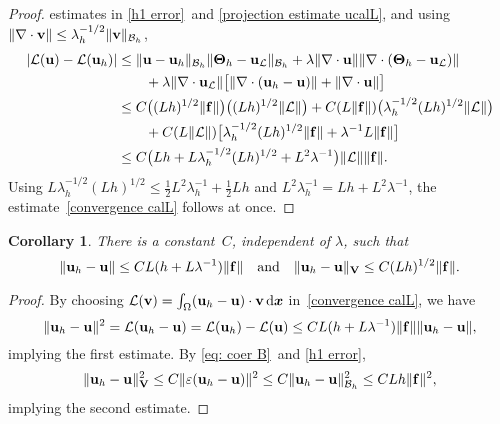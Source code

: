 \documentclass[11pt]{article}
\newcommand{\calB}{\mathcal{B}}
\newcommand{\calL}{\mathcal{L}}
\newcommand{\vf}{{\bf f}}
\newcommand{\vu}{{\bf u}}
\newcommand{\vv}{{\bf v}}
\newcommand{\vV}{{\bf V}}
\newcommand{\bsx}{{\boldsymbol{x}}}
\numberwithin{equation}{section}
\newcommand{\ud}{\mathrm{d}}
\newtheorem{corollary}[theorem]{Corollary}
\begin{document}
\begin{proof}
estimates in \eqref{h1 error}~and \eqref{projection estimate ucalL}, and
using $\|\nabla\cdot\vv\|\le\lambda_h^{-1/2}\|\vv\|_{\calB_h}$,
\begin{align*}
|\calL(\vu)-\calL(\vu_h)|
    &\le\|\vu-\vu_h\|_{\calB_h}\|\mathbf{\Theta}_h-\vu_{\calL}\|_{\calB_h}
    +\lambda \|\nabla\cdot\vu\|
        \|\nabla\cdot(\mathbf{\Theta}_h-\vu_{\calL})\|\\
    &\qquad{}+\lambda\|\nabla\cdot\vu_{\calL}\|
    \bigl[\|\nabla\cdot(\vu_h-\vu)\|+\|\nabla \cdot\vu\|\bigr]\\
    &\le C\bigl((Lh)^{1/2}\|\vf\|\bigr)\bigl((Lh)^{1/2}\|\calL\|\bigr)
    +C(L\|\vf\|)\bigl(\lambda_h^{-1/2}(Lh)^{1/2}\|\calL\|\bigr)\\
    &\qquad{}+C(L\|\calL\|)\bigl[
    \lambda_h^{-1/2}(Lh)^{1/2}\|\vf\|+\lambda^{-1}L\|\vf\|\bigr]\\
    &\le C\bigr(Lh+L\lambda_h^{-1/2}(Lh)^{1/2}+L^2\lambda^{-1}\bigr)
        \|\calL\|\|\vf\|.
\end{align*}
Using $L\lambda_h^{-1/2}(Lh)^{1/2}\le\frac12L^2\lambda_h^{-1}+\tfrac12Lh$ and
$L^2\lambda_h^{-1}=Lh+L^2\lambda^{-1}$, the estimate~\eqref{convergence calL}
follows at once.
\end{proof}

\begin{corollary}\label{cor: L2 H1 errors}
There is a constant~$C$, independent of $\lambda$, such that
\[
\|\vu_h-\vu\|\le CL(h+L\lambda^{-1})\|\vf\|
\quad\text{and}\quad\|\vu_h-\vu\|_{\vV}\le C(Lh)^{1/2}\|\vf\|.
\]
\end{corollary}
\begin{proof}
By choosing 
$\calL(\vv)=\int_\Omega(\vu_h-\vu)\cdot \vv\,\ud\bsx$
in~\eqref{convergence calL}, we have
\[
\|\vu_h-\vu\|^2=\calL(\vu_h-\vu)=\calL(\vu_h)-\calL(\vu)\le
CL(h+L\lambda^{-1})\|\vf\|\|\vu_h-\vu\|,
\]
implying the first estimate. By \eqref{eq: coer B}~and \eqref{h1 error},
\[
\|\vu_h-\vu\|_{\vV}^2\le C\|\varepsilon(\vu_h-\vu)\|^2
\le C\|\vu_h-\vu\|_{\calB_h}^2\le CLh\|\vf\|^2,
\]
implying the second estimate.
\end{proof}
\end{document}
